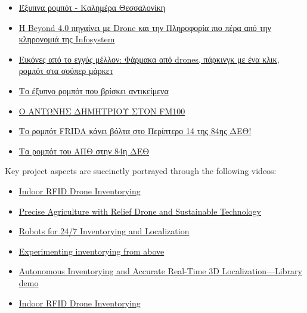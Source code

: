 \begin{itemize}
  \singlespacing
  \item \href{https://www.facebook.com/watch/?v=525073015980746}{Έξυπνα ρομπότ - Καλημέρα Θεσσαλονίκη}
  \item \href{https://www.amna.gr/macedonia/article/593568/I-Beyond-40-pigainei-me-Drone-kai-tin-Pliroforia-pio-pera-apo-tin-klironomia-tis-Infosystem}{Η Beyond 4.0 πηγαίνει με Drone και την Πληροφορία πιο πέρα από την κληρονομιά της Infosystem}
  \item \href{https://www.kathimerini.gr/society/561544489/vinteo-k-eikones-apo-to-eggys-mellon-farmaka-apo-drones-parkingk-me-ena-klik-rompot-sta-soyper-market/}{Εικόνες από το εγγύς μέλλον: Φάρμακα από drones, πάρκινγκ με ένα κλικ, ρομπότ στα σούπερ μάρκετ}
  \item \href{https://www.thessnews.gr/reportaz/to-exypno-robot-pou-vriskei-antikeimena-foto-video/}{Το έξυπνο ρομπότ που βρίσκει αντικείμενα}
  \item \href{https://fm100.gr/media/single/o-antonis-dimitrioy-ston-fm100-o-fm100-stin-84i-deth}{Ο ΑΝΤΩΝΗΣ ΔΗΜΗΤΡΙΟΥ ΣΤΟΝ FM100}
  \item \href{https://www.typosthes.gr/thessaloniki/195192_rompot-frida-kanei-bolta-sto-periptero-14-tis-84is-deth-video}{Το ρομπότ FRIDA κάνει βόλτα στο Περίπτερο 14 της 84ης ΔΕΘ!}
  \item \href{https://www.amna.gr/home/videos/391130/Ta-rompot-tou-APTh-stin-84i-DETh}{Τα ρομπότ του ΑΠΘ στην 84η ΔΕΘ}
\end{itemize}





Key project aspects are succinctly portrayed through the following videos:

\begin{itemize}
  \singlespacing
  \item \href{https://www.youtube.com/watch?v=9YpBIaO4tgY}{Indoor RFID Drone Inventorying }
  \item \href{https://www.facebook.com/watch/?v=1009958989425825}{Precise Agriculture with Relief Drone and Sustainable Technology}
  \item \href{https://www.facebook.com/watch/?v=960592754415188}{Robots for 24/7 Inventorying and Localization}
  \item \href{https://www.facebook.com/watch/?v=1183283855348186}{Experimenting inventorying from above}
  \item \href{https://www.youtube.com/watch?v=bo4lMI640DY}{Autonomous Inventorying and Accurate Real-Time 3D Localization---Library demo}
  \item \href{https://www.youtube.com/watch?v=9YpBIaO4tgY}{Indoor RFID Drone Inventorying}
\end{itemize}



